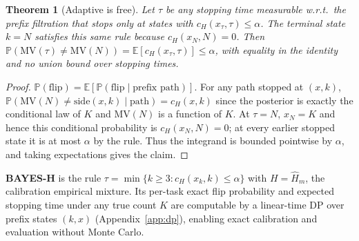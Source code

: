 \documentclass{article}
\newtheorem{theorem}{Theorem}
\theoremstyle{definition}
\theoremstyle{remark}
\newcommand{\flip}{\mathrm{flip}}
\newcommand{\cert}{c_H}
\newcommand{\MV}{\mathrm{MV}}
\newcommand{\E}{\mathbb{E}}
\renewcommand{\P}{\mathbb{P}}
\begin{document}
\begin{theorem}[Adaptive is free]
\label{thm:tower}
Let $\tau$ be any stopping time measurable w.r.t.\ the prefix filtration that
stops only at states with $\cert(x_\tau,\tau)\le\alpha$. The terminal state
$k=N$ satisfies this same rule because $\cert(x_N,N)=0$. Then
$\P(\MV(\tau)\neq\MV(N)) = \E[\cert(x_\tau,\tau)] \le \alpha$,
with equality in the identity and no union bound over stopping times.
\end{theorem}
\begin{proof}
$\P(\flip)=\E[\P(\flip\mid\text{prefix path})]$. For any path stopped at
$(x,k)$, $\P(\MV(N)\neq\mathrm{side}(x,k)\mid\text{path})=\cert(x,k)$ since
the posterior is exactly the conditional law of $K$ and $\MV(N)$ is a
function of $K$. At $\tau=N$, $x_N=K$ and hence this conditional probability
is $\cert(x_N,N)=0$; at every earlier stopped state it is at most $\alpha$ by
the rule. Thus the integrand is bounded pointwise by $\alpha$, and taking
expectations gives the claim.
\end{proof}

\textbf{BAYES-H} is the rule $\tau=\min\{k\ge 3:\cert(x_k,k)\le\alpha\}$ with
$H=\widehat H_m$, the calibration empirical mixture. Its per-task exact flip
probability and expected stopping time under any true count $K$ are computable
by a linear-time DP over prefix states $(k,x)$ (Appendix~\ref{app:dp}),
enabling exact calibration and evaluation without Monte Carlo.
\end{document}
